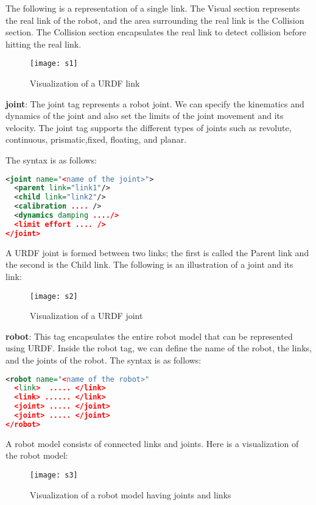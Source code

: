The following is a representation of a single link. The Visual section represents 
the real link of the robot, and the area surrounding the real link is the Collision 
section. The Collision section encapsulates the real link to detect collision before 
hitting the real link.
\begin{figure}[h]
	\centering
	\texttt{[image: s1]}
	\caption{Visualization of a URDF link}
	\label{fig:s1}
\end{figure}
\textbf{joint}: The joint tag represents a robot joint. We can specify the kinematics and dynamics of the joint and also set the limits of the joint movement and its velocity. The joint tag supports the different types of joints such as revolute, continuous, prismatic,fixed, floating, and planar.

The syntax is as follows:
\begin{lstlisting}[language=XML]
<joint name="<name of the joint>">
  <parent link="link1"/>
  <child link="link2"/>
  <calibration .... />
  <dynamics damping ..../>
  <limit effort .... />
</joint>
\end{lstlisting}
A URDF joint is formed between two links; the first is called the Parent link and the second is the Child link. The following is an illustration of a joint and its link:\\
\begin{figure}[h]
	\centering
	\texttt{[image: s2]}
	\caption{Visualization of a URDF joint}
	\label{fig:s2}
\end{figure}
\textbf{robot}: This tag encapsulates the entire robot model that can be represented using URDF. Inside the robot tag, we can define the name of the robot, the links, and the joints of the robot.
The syntax is as follows:
\begin{lstlisting}[language=XML]
<robot name="<name of the robot>"
  <link>  ..... </link>
  <link> ...... </link>
  <joint> ..... </joint>
  <joint> ..... </joint>
</robot>
\end{lstlisting}
A robot model consists of connected links and joints. Here is a visualization of the robot model:
\begin{figure}[h]
	\centering
	\texttt{[image: s3]}
	\caption{Visualization of a robot model having joints and links}
	\label{fig:s3}
\end{figure}

